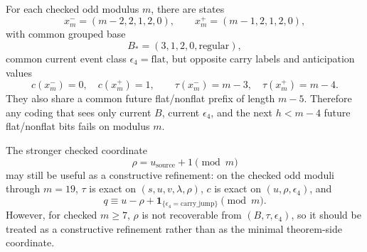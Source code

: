 \begin{proposition}
For each checked odd modulus $m$, there are states
\[
x^-_m=(m-2,2,1,2,0),
\qquad
x^+_m=(m-1,2,1,2,0),
\]
with common grouped base
\[
B_*=(3,1,2,0,\mathrm{regular}),
\]
common current event class $\epsilon_4=\mathrm{flat}$, but opposite carry
labels and anticipation values
\[
c(x^-_m)=0,
\quad
c(x^+_m)=1,
\qquad
\tau(x^-_m)=m-3,
\quad
\tau(x^+_m)=m-4.
\]
They also share a common future flat/nonflat prefix of length $m-5$.
Therefore any coding that sees only current $B$, current $\epsilon_4$, and the
next $h<m-4$ future flat/nonflat bits fails on modulus $m$.
\end{proposition}

\begin{remark}
The stronger checked coordinate
\[
\rho=u_{\mathrm{source}}+1 \pmod m
\]
may still be useful as a constructive refinement: on the checked odd moduli
through $m=19$, $\tau$ is exact on $(s,u,v,\lambda,\rho)$, $c$ is exact on
$(u,\rho,\epsilon_4)$, and
\[
q \equiv u-\rho + \mathbf 1_{\{\epsilon_4=\mathrm{carry\_jump}\}} \pmod m.
\]
However, for checked $m\ge 7$, $\rho$ is not recoverable from
$(B,\tau,\epsilon_4)$, so it should be treated as a constructive refinement
rather than as the minimal theorem-side coordinate.
\end{remark}
